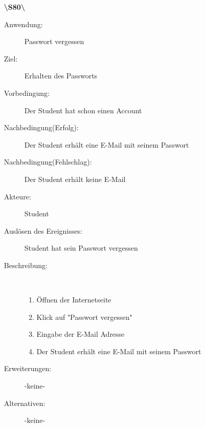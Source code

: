 \documentclass[parskip=full]{scrartcl}
\begin{document}
\begin{enumerate}
  \item[\textbf{\textbackslash S80\textbackslash}] \begin{description}
  	\item[Anwendung:] Passwort vergessen
  	\item[Ziel:] Erhalten des Passworts
  	\item[Vorbedingung:] Der Student hat schon einen Account
  	\item[Nachbedingung(Erfolg):] Der Student erhält eine E-Mail mit seinem
  	Passwort
  	\item[Nachbedingung(Fehlschlag):] Der Student erhält keine E-Mail
  	\item[Akteure:] Student
  	\item[Auslösen des Ereignisses:] Student hat sein Passwort vergessen
  	\item[Beschreibung:]~
  	\begin{enumerate}[1.]
  	  \item Öffnen der Internetseite
      \item Klick auf "Passwort vergessen"
      \item Eingabe der E-Mail Adresse
      \item Der Student erhält eine E-Mail mit seinem Passwort
  	\end{enumerate}
  	\item[Erweiterungen:] -keine-
  	\item[Alternativen:] -keine-
  \end{description}
  \pagebreak
\end{enumerate}
\end{document}
